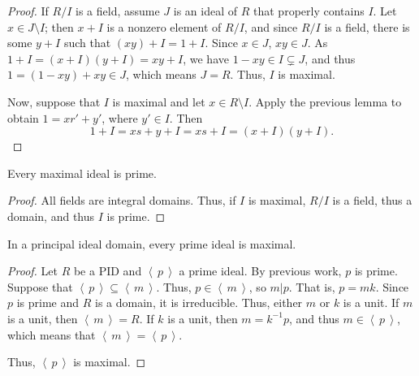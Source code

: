\documentclass[english,course]{lecture}
\newcommand{\ideal}[1]{\left\langle\, #1 \,\right\rangle}
\newenvironment{hint}{\startimportant}{}
\def\startimportant#1\end{[{Hint:} #1]\end}
\theoremstyle{plain}
\def\presnotes{}
\begin{document}

\begin{proof}
	If $R/I$ is a field, assume $J$ is an ideal of $R$ that properly contains $I$.
	Let $x\in J\setminus I$; then $x+I$ is a nonzero element of $R/I$, and since $R/I$ is a field, there is some $y+I$ such that $(xy)+I = 1+I$.
	Since $x\in J$, $xy\in J$.
	As $1+I = (x+I)(y+I) = xy+I$, we have $1-xy\in I\subsetneq J$, and thus $1 = (1-xy)+xy \in J$, which means $J = R$.
	Thus, $I$ is maximal.
	
	Now, suppose that $I$ is maximal and let $x\in R\setminus I$.
	Apply the previous lemma to obtain $1 = xr' + y'$, where $y'\in I$.
	Then
	\[
		1 + I = xs+y + I = xs + I = (x+I)(y+I).
	\]
\end{proof}


\begin{theorem}
	Every maximal ideal is prime.
\end{theorem}

\begin{proof}
	All fields are integral domains. Thus, if $I$ is maximal, $R/I$ is a field, thus a domain, and thus $I$ is prime.
\end{proof}


\begin{theorem}
	In a principal ideal domain, every prime ideal is maximal.
\end{theorem}

\begin{proof}
	Let $R$ be a PID and $\ideal{p}$ a prime ideal.
	By previous work, $p$ is prime.
	Suppose that $\ideal{p} \subseteq \ideal{m}$.
	Thus, $p\in \ideal{m}$, so $m|p$.
	That is, $p = mk$.
	Since $p$ is prime and $R$ is a domain, it is irreducible.
	Thus, either $m$ or $k$ is a unit.
	If $m$ is a unit, then $\ideal{m} = R$.
	If $k$ is a unit, then $m = k^{-1} p$, and thus $m\in \ideal{p}$, which means that $\ideal{m} = \ideal{p}$.
	
	Thus, $\ideal{p}$ is maximal.
\end{proof}
\end{document}
